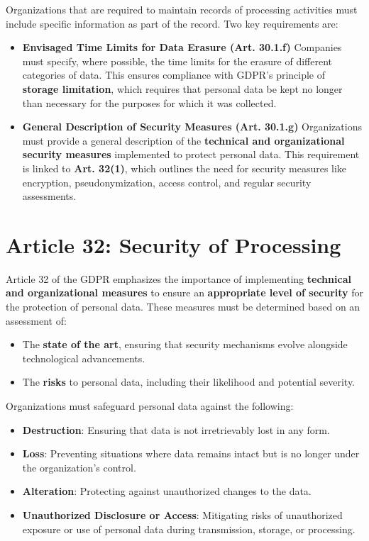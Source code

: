 Organizations that are required to maintain records of processing
activities must include specific information as part of the record.
Two key requirements are:  
\begin{itemize}
  \item \textbf{Envisaged Time Limits for Data Erasure (Art. 30.1.f)}
    Companies must specify, where possible, the time limits for the
    erasure of different categories of data. This ensures compliance
    with GDPR’s principle of \textbf{storage limitation}, which requires
    that personal data be kept no longer than necessary for the purposes
    for which it was collected.  
  \item \textbf{General Description of Security Measures (Art. 30.1.g)}
    Organizations must provide a general description of the
    \textbf{technical and organizational security measures} implemented
    to protect personal data. This requirement is linked to
    \textbf{Art. 32(1)}, which outlines the need for security measures
    like encryption, pseudonymization, access control, and regular
    security assessments.  
\end{itemize}

\section{Article 32: Security of Processing}

Article 32 of the GDPR emphasizes the importance of implementing
\textbf{technical and organizational measures} to ensure an
\textbf{appropriate level of security} for the protection of personal
data. These measures must be determined based on an assessment of:  
\begin{itemize}
  \item The \textbf{state of the art}, ensuring that security
    mechanisms evolve alongside technological advancements.  
  \item The \textbf{risks} to personal data, including their
    likelihood and potential severity.  
\end{itemize}

Organizations must safeguard personal data against the following:  
\begin{itemize}
  \item \textbf{Destruction}: Ensuring that data is not irretrievably
    lost in any form.  
  \item \textbf{Loss}: Preventing situations where data remains intact
    but is no longer under the organization’s control.  
  \item \textbf{Alteration}: Protecting against unauthorized changes
    to the data.  
  \item \textbf{Unauthorized Disclosure or Access}: Mitigating risks
    of unauthorized exposure or use of personal data during
    transmission, storage, or processing.
\end{itemize}

